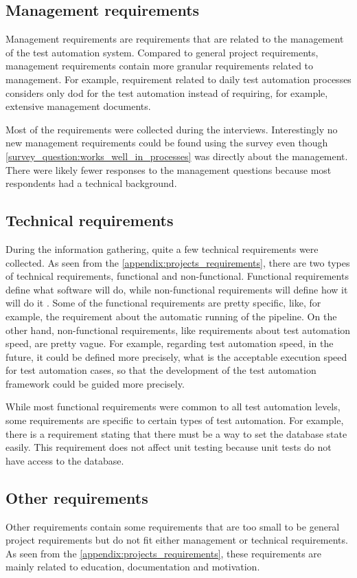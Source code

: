 \subsection{Management requirements}
Management requirements are requirements that are related to the management of the test automation system. Compared to general project requirements, management requirements contain more granular requirements related to management. For example, requirement related to daily test automation processes considers only \gls{dod} for the test automation instead of requiring, for example, extensive management documents.

Most of the requirements were collected during the interviews. Interestingly no new management requirements could be found using the survey even though \autoref{survey_question:works_well_in_processes} was directly about the management. There were likely fewer responses to the management questions because most respondents had a technical background.

\subsection{Technical requirements}
During the information gathering, quite a few technical requirements were collected. As seen from the \autoref{appendix:projects_requirements}, there are two types of technical requirements, functional and non-functional. Functional requirements define what software will do, while non-functional requirements will define how it will do it \cite{ieee1990glossary}. Some of the functional requirements are pretty specific, like, for example, the requirement about the automatic running of the  pipeline. On the other hand, non-functional requirements, like requirements about test automation speed, are pretty vague. For example, regarding test automation speed, in the future, it could be defined more precisely, what is the acceptable execution speed for test automation cases, so that the development of the test automation framework could be guided more precisely.

While most functional requirements were common to all test automation levels, some requirements are specific to certain types of test automation. For example, there is a requirement stating that there must be a way to set the database state easily. This requirement does not affect unit testing because unit tests do not have access to the database.

\subsection{Other requirements}
Other requirements contain some requirements that are too small to be general project requirements but do not fit either management or technical requirements. As seen from the \autoref{appendix:projects_requirements}, these requirements are mainly related to education, documentation and motivation.

